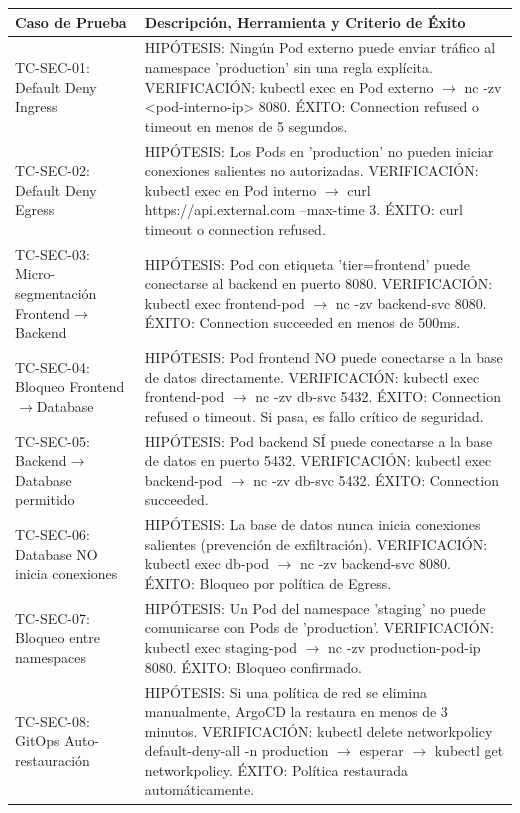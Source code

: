 \documentclass[journal]{IEEEtran}
\begin{document}
\begin{table}[htbp]
\centering
\scriptsize
\begin{tabularx}{\textwidth}{|Y|Y|}
\hline
\textbf{Caso de Prueba} & \textbf{Descripción, Herramienta y Criterio de Éxito} \\
\hline
TC-SEC-01: Default Deny Ingress & HIPÓTESIS: Ningún Pod externo puede enviar tráfico al namespace 'production' sin una regla explícita. VERIFICACIÓN: kubectl exec en Pod externo $\rightarrow$ nc -zv <pod-interno-ip> 8080. ÉXITO: Connection refused o timeout en menos de 5 segundos. \\
TC-SEC-02: Default Deny Egress & HIPÓTESIS: Los Pods en 'production' no pueden iniciar conexiones salientes no autorizadas. VERIFICACIÓN: kubectl exec en Pod interno $\rightarrow$ curl https://api.external.com --max-time 3. ÉXITO: curl timeout o connection refused. \\
TC-SEC-03: Micro-segmentación Frontend$\rightarrow$Backend & HIPÓTESIS: Pod con etiqueta 'tier=frontend' puede conectarse al backend en puerto 8080. VERIFICACIÓN: kubectl exec frontend-pod $\rightarrow$ nc -zv backend-svc 8080. ÉXITO: Connection succeeded en menos de 500ms. \\
TC-SEC-04: Bloqueo Frontend$\rightarrow$Database & HIPÓTESIS: Pod frontend NO puede conectarse a la base de datos directamente. VERIFICACIÓN: kubectl exec frontend-pod $\rightarrow$ nc -zv db-svc 5432. ÉXITO: Connection refused o timeout. Si pasa, es fallo crítico de seguridad. \\
TC-SEC-05: Backend$\rightarrow$Database permitido & HIPÓTESIS: Pod backend SÍ puede conectarse a la base de datos en puerto 5432. VERIFICACIÓN: kubectl exec backend-pod $\rightarrow$ nc -zv db-svc 5432. ÉXITO: Connection succeeded. \\
TC-SEC-06: Database NO inicia conexiones & HIPÓTESIS: La base de datos nunca inicia conexiones salientes (prevención de exfiltración). VERIFICACIÓN: kubectl exec db-pod $\rightarrow$ nc -zv backend-svc 8080. ÉXITO: Bloqueo por política de Egress. \\
TC-SEC-07: Bloqueo entre namespaces & HIPÓTESIS: Un Pod del namespace 'staging' no puede comunicarse con Pods de 'production'. VERIFICACIÓN: kubectl exec staging-pod $\rightarrow$ nc -zv production-pod-ip 8080. ÉXITO: Bloqueo confirmado. \\
TC-SEC-08: GitOps Auto-restauración & HIPÓTESIS: Si una política de red se elimina manualmente, ArgoCD la restaura en menos de 3 minutos. VERIFICACIÓN: kubectl delete networkpolicy default-deny-all -n production $\rightarrow$ esperar $\rightarrow$ kubectl get networkpolicy. ÉXITO: Política restaurada automáticamente. \\
\hline
\end{tabularx}
\end{table}
\end{document}
